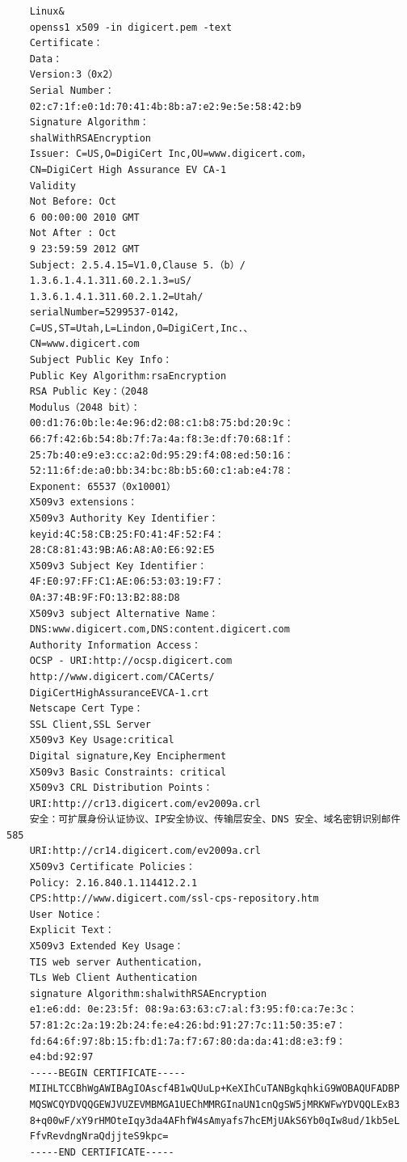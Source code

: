 \begin{verbatim}
    Linux&
    openss1 x509 -in digicert.pem -text
    Certificate：
    Data：
    Version:3（0x2）
    Serial Number：
    02:c7:1f:e0:1d:70:41:4b:8b:a7:e2:9e:5e:58:42:b9
    Signature Algorithm：
    shalWithRSAEncryption
    Issuer: C=US,O=DigiCert Inc,OU=www.digicert.com，
    CN=DigiCert High Assurance EV CA-1
    Validity
    Not Before: Oct
    6 00:00:00 2010 GMT
    Not After : Oct
    9 23:59:59 2012 GMT
    Subject: 2.5.4.15=V1.0,Clause 5.（b）/
    1.3.6.1.4.1.311.60.2.1.3=uS/
    1.3.6.1.4.1.311.60.2.1.2=Utah/
    serialNumber=5299537-0142，
    C=US,ST=Utah,L=Lindon,O=DigiCert,Inc.、
    CN=www.digicert.com
    Subject Public Key Info：
    Public Key Algorithm:rsaEncryption
    RSA Public Key：（2048
    Modulus（2048 bit）：
    00:d1:76:0b:le:4e:96:d2:08:c1:b8:75:bd:20:9c：
    66:7f:42:6b:54:8b:7f:7a:4a:f8:3e:df:70:68:1f：
    25:7b:40:e9:e3:cc:a2:0d:95:29:f4:08:ed:50:16：
    52:11:6f:de:a0:bb:34:bc:8b:b5:60:c1:ab:e4:78：
    Exponent: 65537（0x10001）
    X509v3 extensions：
    X509v3 Authority Key Identifier：
    keyid:4C:58:CB:25:FO:41:4F:52:F4：
    28:C8:81:43:9B:A6:A8:A0:E6:92:E5
    X509v3 Subject Key Identifier：
    4F:E0:97:FF:C1:AE:06:53:03:19:F7：
    0A:37:4B:9F:FO:13:B2:88:D8
    X509v3 subject Alternative Name：
    DNS:www.digicert.com,DNS:content.digicert.com
    Authority Information Access：
    OCSP - URI:http://ocsp.digicert.com
    http://www.digicert.com/CACerts/
    DigiCertHighAssuranceEVCA-1.crt
    Netscape Cert Type：
    SSL Client,SSL Server
    X509v3 Key Usage:critical
    Digital signature,Key Encipherment
    X509v3 Basic Constraints: critical
    X509v3 CRL Distribution Points：
    URI:http://cr13.digicert.com/ev2009a.crl
    安全：可扩展身份认证协议、IP安全协议、传输层安全、DNS 安全、域名密钥识别邮件585
    URI:http://cr14.digicert.com/ev2009a.crl
    X509v3 Certificate Policies：
    Policy: 2.16.840.1.114412.2.1
    CPS:http://www.digicert.com/ssl-cps-repository.htm
    User Notice：
    Explicit Text：
    X509v3 Extended Key Usage：
    TIS web server Authentication，
    TLs Web Client Authentication
    signature Algorithm:shalwithRSAEncryption
    e1:e6:dd: 0e:23:5f: 08:9a:63:63:c7:al:f3:95:f0:ca:7e:3c：
    57:81:2c:2a:19:2b:24:fe:e4:26:bd:91:27:7c:11:50:35:e7：
    fd:64:6f:97:8b:15:fb:d1:7a:f7:67:80:da:da:41:d8:e3:f9：
    e4:bd:92:97
    -----BEGIN CERTIFICATE-----
    MIIHLTCCBhWgAWIBAgIOAscf4B1wQUuLp+KeXIhCuTANBgkqhkiG9WOBAQUFADBP
    MQSWCQYDVQQGEWJVUZEVMBMGA1UEChMMRGInaUN1cnQgSW5jMRKWFwYDVQQLExB3
    8+q00wF/xY9rHMOteIqy3da4AFhfW4sAmyafs7hcEMjUAkS6Yb0qIw8ud/1kb5eL
    FfvRevdngNraQdjjteS9kpc=
    -----END CERTIFICATE-----
\end{verbatim}
